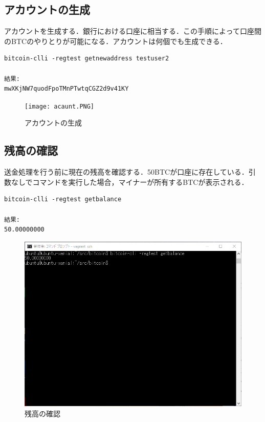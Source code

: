 \subsection{アカウントの生成}
アカウントを生成する．銀行における口座に相当する．この手順によって口座間のBTCのやりとりが可能になる．アカウントは何個でも生成できる．


\begin{verbatim}
bitcoin-clli -regtest getnewaddress testuser2

結果:
mwXKjNW7quodFpoTMnPTwtqCGZ2d9v41KY
\end{verbatim}

\begin{figure}[h]
\centering
\texttt{[image: acaunt.PNG]}
\caption{アカウントの生成}\label{サンプル図}
\end{figure}

\newpage


\subsection{残高の確認}
送金処理を行う前に現在の残高を確認する．50BTCが口座に存在している．引数なしでコマンドを実行した場合，マイナーが所有するBTCが表示される．

\begin{verbatim}
bitcoin-clli -regtest getbalance

結果:
50.00000000
\end{verbatim}

\begin{figure}[h]
\centering
\includegraphics[width=12cm]{zandaka.PNG}
\caption{残高の確認}\label{サンプル図}
\end{figure}



